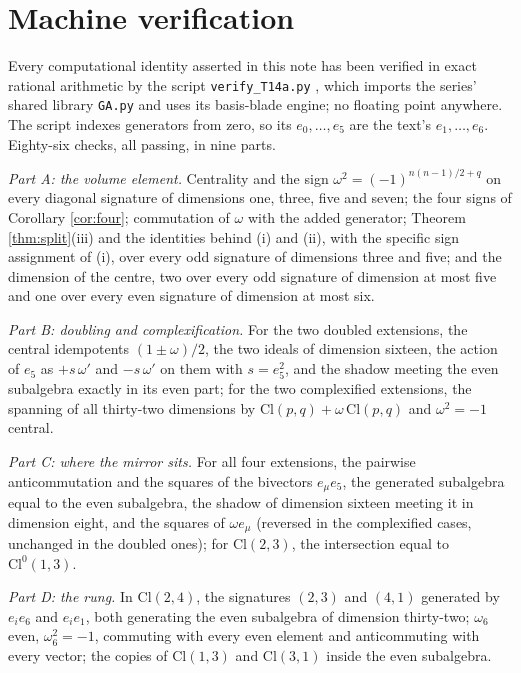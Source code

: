 \documentclass[11pt]{article}
\theoremstyle{definition}
\newcommand{\Cl}{\mathrm{Cl}}
\begin{document}
\section{Machine verification}\label{sec:verification}

Every computational identity asserted in this note has been verified in exact rational arithmetic by the script \texttt{verify\_T14a.py} \cite{ButlerVerifyT14ext}, which imports the series' shared library \texttt{GA.py} and uses its basis-blade engine; no floating point anywhere. The script indexes generators from zero, so its $e_{0}, \ldots, e_{5}$ are the text's $e_{1}, \ldots, e_{6}$. Eighty-six checks, all passing, in nine parts.

\emph{Part A: the volume element.} Centrality and the sign $\omega^{2} = (-1)^{n(n-1)/2+q}$ on every diagonal signature of dimensions one, three, five and seven; the four signs of Corollary \ref{cor:four}; commutation of $\omega$ with the added generator; Theorem \ref{thm:split}(iii) and the identities behind (i) and (ii), with the specific sign assignment of (i), over every odd signature of dimensions three and five; and the dimension of the centre, two over every odd signature of dimension at most five and one over every even signature of dimension at most six.

\emph{Part B: doubling and complexification.} For the two doubled extensions, the central idempotents $(1 \pm \omega)/2$, the two ideals of dimension sixteen, the action of $e_{5}$ as $+s\,\omega'$ and $-s\,\omega'$ on them with $s = e_{5}^{2}$, and the shadow meeting the even subalgebra exactly in its even part; for the two complexified extensions, the spanning of all thirty-two dimensions by $\Cl(p,q) + \omega\,\Cl(p,q)$ and $\omega^{2} = -1$ central.

\emph{Part C: where the mirror sits.} For all four extensions, the pairwise anticommutation and the squares of the bivectors $e_{\mu}e_{5}$, the generated subalgebra equal to the even subalgebra, the shadow of dimension sixteen meeting it in dimension eight, and the squares of $\omega e_{\mu}$ (reversed in the complexified cases, unchanged in the doubled ones); for $\Cl(2,3)$, the intersection equal to $\Cl^{0}(1,3)$.

\emph{Part D: the rung.} In $\Cl(2,4)$, the signatures $(2,3)$ and $(4,1)$ generated by $e_{i}e_{6}$ and $e_{i}e_{1}$, both generating the even subalgebra of dimension thirty-two; $\omega_{6}$ even, $\omega_{6}^{2} = -1$, commuting with every even element and anticommuting with every vector; the copies of $\Cl(1,3)$ and $\Cl(3,1)$ inside the even subalgebra.
\end{document}
